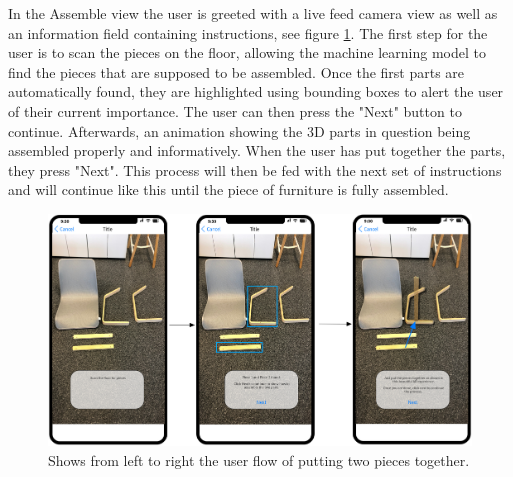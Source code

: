 In the Assemble view the user is greeted with a live feed camera view as well as an information field containing instructions, see figure \ref{fig:assemble-view}. The first step for the user is to scan the pieces on the floor, allowing the machine learning model to find the pieces that are supposed to be assembled. Once the first parts are automatically found, they are highlighted using bounding boxes to alert the user of their current importance. The user can then press the "Next" button to continue. Afterwards, an animation showing the 3D parts in question being assembled properly and informatively. When the user has put together the parts, they press "Next". This process will then be fed with the next set of instructions and will continue like this until the	 piece of furniture is fully assembled.
\begin{figure}[hbtp]
\begin{center}
\includegraphics[height = 0.4\textheight]{./Images/AR_Scene.png}
\caption{Shows from left to right the user flow of putting two pieces together.}
\label{fig:assemble-view}
\end{center}
\end{figure}

\newpage